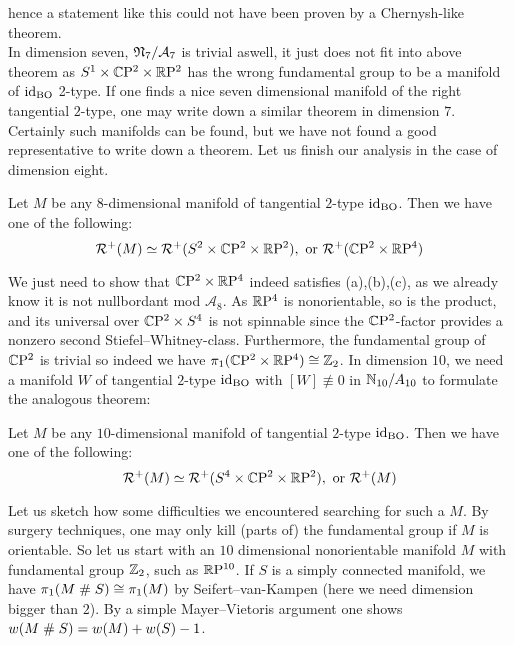 hence a statement like this could not have been proven by a Chernysh-like theorem.\\
In dimension seven, $\mathfrak{N}_7/\mathcal{A}_7$ is trivial aswell, it just does not fit into above theorem as $S^1\times\mathbb{C}\mathrm{P}^2\times\mathbb{R}\mathrm{P}^2$ has the wrong fundamental group to be a manifold of $\operatorname{id}_{\mathrm{BO}}$ 2-type.
If one finds a nice seven dimensional manifold of the right tangential $2$-type, one may write down a similar theorem in dimension $7$.
Certainly such manifolds can be found, but we have not found a  good representative to write down a theorem.
Let us finish our analysis in the case of dimension eight.
\begin{theorem}[Dimension $8$]
    Let $M$ be any $8$-dimensional manifold of tangential $2$-type $\operatorname{id}_{\mathrm{BO}}$. Then we have one of the following:
    \begin{equation*}
        \mathcal{R}^+(M) \simeq \mathcal{R}^+(S^2\times\mathbb{C}\mathrm{P}^2\times\mathbb{R}\mathrm{P}^2), \text{ or } \mathcal{R}^+(\mathbb{C}\mathrm{P}^2\times\mathbb{R}\mathrm{P}^4)
    \end{equation*}
\end{theorem}
\prf
We just need to show that $\mathbb{C}\mathrm{P}^2\times\mathbb{R}\mathrm{P}^4$ indeed satisfies (a),(b),(c), as we already know it is not nullbordant mod $\mathcal{A}_8$.
As $\mathbb{R}\mathrm{P}^4$ is nonorientable, so is the product, and its universal over $\mathbb{C}\mathrm{P}^2\times S^4$ is not spinnable since the $\mathbb{C}\mathrm{P}^2$-factor provides a nonzero second Stiefel--Whitney-class.
Furthermore, the fundamental group of $\mathbb{C}\mathrm{P}^2$ is trivial so indeed we have $\pi_1(\mathbb{C}\mathrm{P}^2\times\mathbb{R}\mathrm{P}^4) \cong \mathbb{Z}_2$.
\endprf
In dimension $10$, we need a manifold $W$ of tangential $2$-type $\operatorname{id}_{\mathrm{BO}}$ with $[W]\not\equiv 0$ in $\mathbb{N}_{10}/A_{10}$ to formulate the analogous theorem:
\begin{theorem}[Dimension $10$]
    Let $M$ be any $10$-dimensional manifold of tangential $2$-type $\operatorname{id}_{\mathrm{BO}}$. Then we have one of the following:
    \begin{equation*}
        \mathcal{R}^+(M) \simeq \mathcal{R}^+(S^4\times\mathbb{C}\mathrm{P}^2\times\mathbb{R}\mathrm{P}^2), \text{ or } \mathcal{R}^+(M)
    \end{equation*}
\end{theorem}
Let us sketch how some difficulties we encountered searching for such a $M$. 
By surgery techniques, one may only kill (parts of) the fundamental group if $M$ is orientable.
So let us start with an $10$ dimensional nonorientable manifold $M$ with fundamental group $\mathbb{Z}_2$, such as $\mathbb{R}\mathrm{P}^{10}$.
If $S$ is a simply connected manifold, we have $\pi_1(M\mathrel\# S) \cong \pi_1(M)$ by Seifert--van-Kampen (here we need dimension bigger than $2$).
By a simple Mayer--Vietoris argument one shows $w(M\mathrel\# S) = w(M) + w(S) - 1$.
